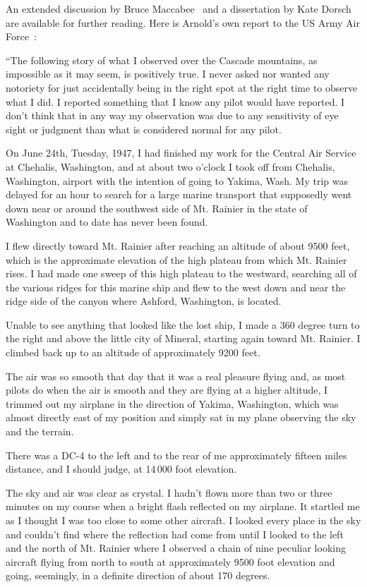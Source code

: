 An extended discussion by Bruce Maccabee~\cite{Maccabee2017Jun} and a dissertation by Kate Dorsch~\cite{Dorsch2019} are available for further reading.
Here is Arnold's own report to the US Army Air Force~\cite{Arnold47}:
\begin{svgraybox}
``The following story of what I observed over the Cascade mountains, as impossible as it may seem, is positively true. I never asked nor wanted any notoriety for just accidentally being in the right spot at the right time to observe what I did. I reported something that I know any pilot would have reported. I don't think that in any way my observation was due to any sensitivity of eye sight or judgment than what is considered normal for any pilot.

      On June 24th, Tuesday, 1947, I had finished my work for the Central Air Service at Chehalis, Washington, and at about two o'clock I took off from Chehalis, Washington, airport with the intention of going to Yakima, Wash. My trip was delayed for an hour to search for a large marine transport that supposedly went down near or around the southwest side of Mt. Rainier in the state of Washington and to date has never been found.

      I flew directly toward Mt. Rainier after reaching an altitude of about 9500 feet, which is the approximate elevation of the high plateau from which Mt. Rainier rises. I had made one sweep of this high plateau to the westward, searching all of the various ridges for this marine ship and flew to the west down and near the ridge side of the canyon where Ashford, Washington, is located.

      Unable to see anything that looked like the lost ship, I made a 360 degree turn to the right and above the little city of Mineral, starting again toward Mt. Rainier. I climbed back up to an altitude of approximately 9200 feet.

      The air was so smooth that day that it was a real pleasure flying and, as most pilots do when the air is smooth and they are flying at a higher altitude, I trimmed out my airplane in the direction of Yakima, Washington, which was almost directly east of my position and simply sat in my plane observing the sky and the terrain.


There was a DC-4 to the left and to the rear of me approximately fifteen miles distance, and I should judge, at 14\,000 foot elevation.

      The sky and air was clear as crystal. I hadn't flown more than two or three minutes on my course when a bright flash reflected on my airplane. It startled me as I thought I was too close to some other aircraft. I looked every place in the sky and couldn't find where the reflection had come from until I looked to the left and the north of Mt. Rainier where I observed a chain of nine peculiar looking aircraft flying from north to south at approximately 9500 foot elevation and going, seemingly, in a definite direction of about 170 degrees.


\end{svgraybox}
